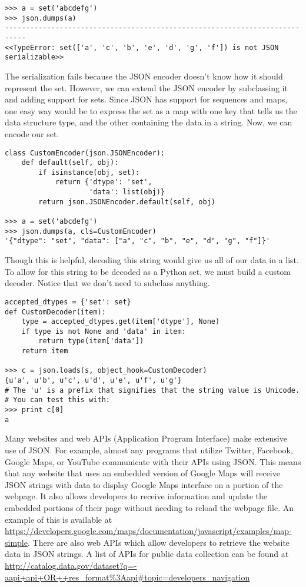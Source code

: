 \begin{lstlisting}
>>> a = set('abcdefg')
>>> json.dumps(a)
---------------------------------------------------------------------------
<<TypeError: set(['a', 'c', 'b', 'e', 'd', 'g', 'f']) is not JSON serializable>>
\end{lstlisting}

The serialization fails because the JSON encoder doesn't know how it should represent the set.
However, we can extend the JSON encoder by subclassing it and adding support for sets.
Since JSON has support for sequences and maps, one easy way would be to express the set as a map with one key that tells us the data structure type, and the other containing the data in a string.
Now, we can encode our set.

\begin{lstlisting}
class CustomEncoder(json.JSONEncoder):
    def default(self, obj):
        if isinstance(obj, set):
            return {'dtype': 'set',
                    'data': list(obj)}
        return json.JSONEncoder.default(self, obj)

>>> a = set('abcdefg')
>>> json.dumps(a, cls=CustomEncoder)
'{"dtype": "set", "data": ["a", "c", "b", "e", "d", "g", "f"]}'
\end{lstlisting}

Though this is helpful, decoding this string would give us all of our data in a list.
To allow for this string to be decoded as a Python set, we must build a custom decoder.
Notice that we don't need to subclass anything.

\begin{lstlisting}
accepted_dtypes = {'set': set}
def CustomDecoder(item):
    type = accepted_dtypes.get(item['dtype'], None)
    if type is not None and 'data' in item:
        return type(item['data'])
    return item

>>> c = json.loads(s, object_hook=CustomDecoder)
{u'a', u'b', u'c', u'd', u'e', u'f', u'g'}
# The 'u' is a prefix that signifies that the string value is Unicode.
# You can test this with:
>>> print c[0]
a
\end{lstlisting}

Many websites and web APIs (Application Program Interface) make extensive use of JSON.
For example, almost any programs that utilize Twitter, Facebook, Google Maps, or YouTube communicate with their APIs using JSON.
This means that any website that uses an embedded version of Google Maps will receive JSON strings with data to display Google Maps interface on a portion of the webpage.
It also allows developers to receive information and update the embedded portions of their page without needing to reload the webpage file.
An example of this is available at \url{https://developers.google.com/maps/documentation/javascript/examples/map-simple}.
There are also web APIs which allow developers to retrieve the website data in JSON strings.
A list of APIs for public data collection can be found at \url{http://catalog.data.gov/dataset?q=-aapi+api+OR++res_format%3Aapi#topic=developers_navigation}

